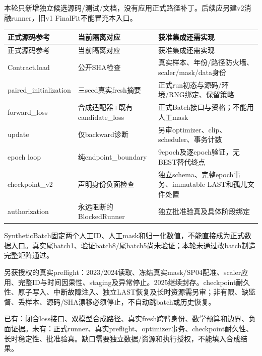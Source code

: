\documentclass[UTF8,fontset=fandol,10pt]{ctexart}
\begin{document}
本轮只新增独立候选源码/\allowbreak{}测试/\allowbreak{}文档，没有应用正式路径补丁。后续应另建v2消融runner，旧v1 FinalFit不能冒充本入口。

\begingroup\small\setlength{\tabcolsep}{3pt}\renewcommand{\arraystretch}{1.12}
\begin{longtable}{>{\raggedright\arraybackslash}p{\dimexpr(\linewidth-6\tabcolsep)/3\relax}>{\raggedright\arraybackslash}p{\dimexpr(\linewidth-6\tabcolsep)/3\relax}>{\raggedright\arraybackslash}p{\dimexpr(\linewidth-6\tabcolsep)/3\relax}}
\toprule
正式源码参考 & 当前隔离对应 & 获准集成还需实现 \\
\midrule\endfirsthead
正式源码参考 & 当前隔离对应 & 获准集成还需实现 \\
\midrule\endhead
Contract.load & 公开SHA检查 & 真实样本、年份/\allowbreak{}路径防火墙、scaler/\allowbreak{}mask/\allowbreak{}data身份 \\
paired\_\allowbreak{}initialization & 三seed真实fresh摘要 & 正式run初态与源码/\allowbreak{}环境/\allowbreak{}RNG绑定、保留策略 \\
forward\_\allowbreak{}loss & 合成适配器+既有candidate\_\allowbreak{}loss & 正式Batch接口与资格；不能用人工mask \\
update & 仅backward诊断 & 另审optimizer、clip、scheduler、事务计数 \\
epoch loop & 纯endpoint\_\allowbreak{}boundary & 9epoch及逐epoch验证，无BEST替代终点 \\
checkpoint\_\allowbreak{}v2 & 声明身份负面检查 & 独立schema、完整epoch事务、immutable LAST和孤儿文件处置 \\
authorization & 永远阻断的BlockedRunner & 独立批准验真及具体阶段绑定 \\
\bottomrule\end{longtable}\endgroup

SyntheticBatch固定两个人工ID、人工mask和归一化数值，不能直接成为正式数据入口。真实尾batch1、验证batch8/\allowbreak{}尾batch5尚未验证；本轮未通过改batch制造完整矩阵通过。

另获授权的真实preflight：2023/\allowbreak{}2024读取、冻结真实mask/\allowbreak{}SP04配准、scaler应用、完整ID与时间因果性、staging及异常停止。2025继续封存。checkpoint耐久性、原子写入、中断故障注入、独立LAST恢复及长时资源需另审；非有限、缺监督、丢样本、源码/\allowbreak{}SHA漂移必须停止，不自动跳batch或历史恢复。

已有：闭合loss接口、双模型合成路径、真实fresh跨臂身份、数学预算和边界、负面证据。未有：正式runner、真实preflight、optimizer事务、checkpoint耐久性、长时稳定性、批准验真。缺口需要独立数据/\allowbreak{}资源和执行授权，不能填入合成结果。
\end{document}
